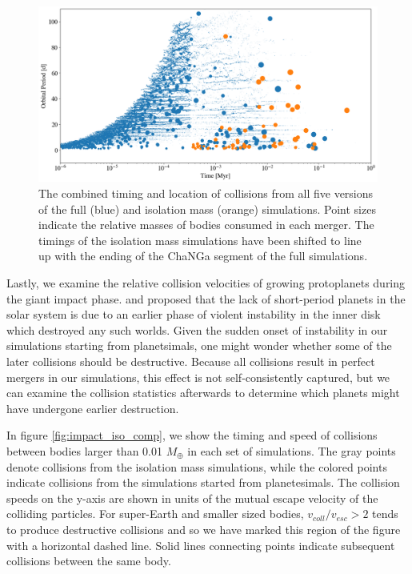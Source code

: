 
\begin{figure}
\begin{center}
    \includegraphics[width=\textwidth]{figures/stip/full_coll_iso_comp.png}
    \caption{The combined timing and location of collisions from all five versions of the full (blue) and isolation mass (orange) simulations. Point sizes indicate the relative masses of bodies consumed in each merger. The timings of the isolation mass simulations have been shifted to line up with the ending of the {\sc ChaNGa} segment of the full simulations.\label{fig:full_coll_iso_comp}}
\end{center}
\end{figure}


Lastly, we examine the relative collision velocities of growing protoplanets during the giant impact phase. \cite{volk15} and \cite{batygin15} proposed that the lack of short-period planets in the solar system is due to an earlier phase of violent instability in the inner disk which destroyed any such worlds. Given the sudden onset of instability in our simulations starting from planetsimals, one might wonder whether some of the later collisions should be destructive. Because all collisions result in perfect mergers in our simulations, this effect is not self-consistently captured, but we can examine the collision statistics afterwards to determine which planets might have undergone earlier destruction.

In figure \ref{fig:impact_iso_comp}, we show the timing and speed of collisions between bodies larger than 0.01 $M_{\oplus}$ in each set of simulations. The gray points denote collisions from the isolation mass simulations, while the colored points indicate collisions from the simulations started from planetesimals. The collision speeds on the y-axis are shown in units of the mutual escape velocity of the colliding particles. For super-Earth and smaller sized bodies, $v_{coll}/v_{esc} > 2$ tends to produce destructive collisions \cite{marcus09} and so we have marked this region of the figure with a horizontal dashed line. Solid lines connecting points indicate subsequent collisions between the same body.

